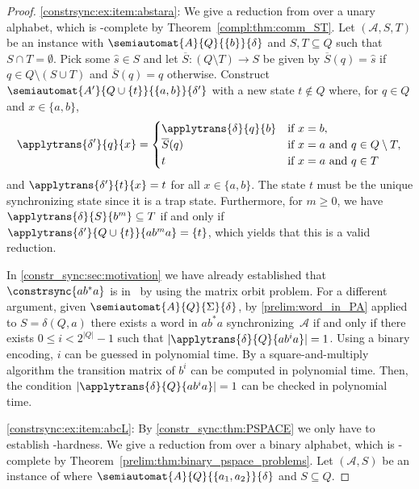\begin{proof}
	\ref{constrsync:ex:item:abstara}:
	We give a reduction from \DST
	over a unary alphabet, which is \NP-complete by Theorem~\ref{compl:thm:comm_ST}.
	Let $(\mathcal A, S, T)$ be an instance
	with $\semiautomat{A}{Q}{\{b\}}{\delta}$ and $S, T \subseteq Q$
	such that $S \cap T = \emptyset$.
	Pick some $\hat s \in S$
	and let $\overline{S} \colon ( Q \setminus T ) \to S$
	be given by $\overline{S}(q) = \hat{s}$ if $q \in Q \setminus (S \cup T)$
	and $\overline{S}(q) = q$ otherwise. Construct
	$\semiautomat{A'}{Q \cup \{t\}}{\{a,b\}}{\delta'}$ with a new state $t \notin Q$ 
	where, for $q \in Q$ and $x \in \{a,b\}$,
	\[
	\applytrans{\delta'}{q}{x} = \begin{cases}
		\applytrans{\delta}{q}{b} & \text{if } x = b, \\
		\overline{S}(q)           & \text{if } x = a \text{ and } q \in Q \setminus T, \\
		t                         & \text{if } x = a \text{ and } q \in T
	\end{cases}
	\]
	and $\applytrans{\delta'}{t}{x} = t$ for all $x \in \{a,b\}$. 
	The state $t$ must be the unique synchronizing state since it is a trap state.
	Furthermore, for $m \ge 0$,     
	we have $\applytrans{\delta}{S}{b^m} \subseteq T$
	if and only if $\applytrans{\delta'}{Q\cup \{t\}}{ab^ma} = \{t\}$,
	which yields that this is a valid reduction.
	
	In \cref{constr_sync:sec:motivation} we have already established that
	$\constrsync{ab^*a}$ is in \NP\ 
	by using the matrix orbit problem.
	For a different argument, given $\semiautomat{A}{Q}{\Sigma}{\delta}$,
	by \cref{prelim:word_in_PA} applied to $S = \delta(Q, a)$
	there exists a word in $ab^*a$ synchronizing~$\mathcal A$
	if and only if there exists $0 \le i < 2^{|Q|} - 1$
	such that $|\applytrans{\delta}{Q}{ab^ia}| = 1$.
	Using a binary encoding, $i$ can be guessed
	in polynomial time. By a square-and-multiply
	algorithm the transition matrix of $b^i$ can be computed in polynomial time. Then,
	the condition $|\applytrans{\delta}{Q}{ab^ia}| = 1$  
	can be checked in polynomial time.
		
	\ref{constrsync:ex:item:abcL}:
	By \cref{constr_sync:thm:PSPACE} we only have to establish \PSPACE-hardness.
	We give a reduction from \SIS over a binary alphabet, which
	is \PSPACE-complete by Theorem~\ref{prelim:thm:binary_pspace_problems}. 
	Let $(\mathcal A, S)$ be an instance of \SIS
	where $\semiautomat{A}{Q}{\{a_1, a_2\}}{\delta}$ 
	and $S \subseteq Q$. 		
			

\end{proof}
